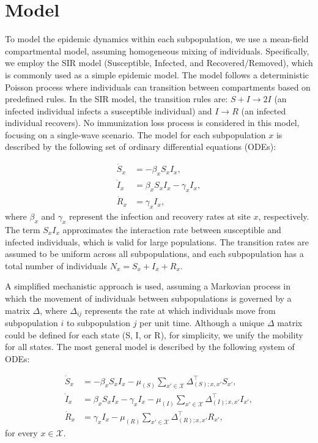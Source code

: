 \section{Model}

To model the epidemic dynamics within each subpopulation, we use a mean-field compartmental model, assuming homogeneous mixing of individuals. Specifically, we employ the SIR model (Susceptible, Infected, and Recovered/Removed), which is commonly used as a simple epidemic model. The model follows a deterministic Poisson process where individuals can transition between compartments based on predefined rules. In the SIR model, the transition rules are: \( S + I \rightarrow 2I \) (an infected individual infects a susceptible individual) and \( I \rightarrow R \) (an infected individual recovers). No immunization loss process is considered in this model, focusing on a single-wave scenario. The model for each subpopulation \( x \) is described by the following set of ordinary differential equations (ODEs):

\begin{equation}
\begin{aligned}
    \dot{S}_{x} &= -\beta_{x} S_{x} I_{x}, \\
    \dot{I}_{x} &= \beta_{x} S_{x} I_{x} - \gamma_{x} I_{x}, \\
    \dot{R}_{x} &= \gamma_{x} I_{x},
\end{aligned}
\end{equation}
where \( \beta_x \) and \( \gamma_x \) represent the infection and recovery rates at site \( x \), respectively. The term \( S_x I_x \) approximates the interaction rate between susceptible and infected individuals, which is valid for large populations. The transition rates are assumed to be uniform across all subpopulations, and each subpopulation has a total number of individuals \( N_x = S_x + I_x + R_x \).

A simplified mechanistic approach is used, assuming a Markovian process in which the movement of individuals between subpopulations is governed by a matrix \( \Delta \), where \( \Delta_{ij} \) represents the rate at which individuals move from subpopulation \( i \) to subpopulation \( j \) per unit time. Although a unique \( \Delta \) matrix could be defined for each state (S, I, or R), for simplicity, we unify the mobility for all states. The most general model is described by the following system of ODEs:

\begin{equation}
\begin{aligned}
    \dot{S}_{x} &= -\beta_{x} S_{x} I_{x} - \mu_{(S)} \sum_{x' \in \mathcal{X}} \Delta_{(S);x,x'}^{\top} S_{x'}, \\
    \dot{I}_{x} &= \beta_{x} S_{x} I_{x} - \gamma_{x} I_{x} - \mu_{(I)} \sum_{x' \in \mathcal{X}} \Delta_{(I);x,x'}^{\top} I_{x'}, \\
    \dot{R}_{x} &= \gamma_{x} I_{x} - \mu_{(R)} \sum_{x' \in \mathcal{X}} \Delta_{(R);x,x'}^{\top} R_{x'},
\end{aligned}
\end{equation}
for every \( x \in \mathcal{X} \).

